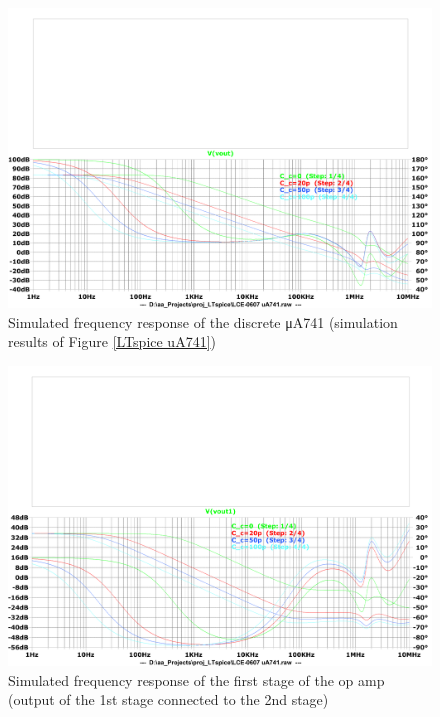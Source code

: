 \documentclass[UTF8]{article}
\begin{document}
\begin{figure}[H]\centering
    \includegraphics[width=\columnwidth]{LCE-06-07-运放设计/assets/uA741/gain of uA741.pdf}
    \caption{Simulated frequency response of the discrete μA741 (simulation results of Figure \ref{LTspice uA741})}
    \label{simulated uA741 1}
\end{figure}

\begin{figure}[H]\centering
    \includegraphics[width=\columnwidth]{LCE-06-07-运放设计/assets/uA741/gain of uA741 (2).pdf}
    \caption{Simulated frequency response of the first stage of the op amp (output of the 1st stage connected to the 2nd stage)}
    \label{simulated uA741 2}
\end{figure}
\end{document}
